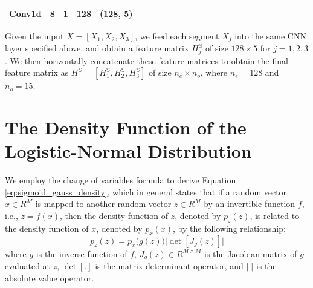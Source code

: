 \begin{appendices}
\begin{table}[h]
\begin{threeparttable}
\begin{tabular}{L{50pt}C{40pt}C{30pt}C{40pt}C{60pt}}
    Conv1d & 8 & 1 & 128 & (128, 5) \\
    \bottomrule
\end{tabular}
\end{threeparttable}
\end{table}

Given the input $X=[X_1,X_2,X_3]$, we feed each segment $X_j$ into the same CNN layer specified above, and obtain a feature matrix $H_j^\mathbb{S}$ of size $128 \times 5$ for $j=1,2,3$. We then horizontally concatenate these feature matrices to obtain the final feature matrix as $H^\mathbb{S}=[H_1^\mathbb{S}, H_2^\mathbb{S}, H_3^\mathbb{S}]$ of size $n_e \times n_o$, where $n_e=128$ and $n_o=15$.

\clearpage

\section{The Density Function of the Logistic-Normal Distribution}\label{apd:der_logistic_normal}

We employ the change of variables formula  to derive Equation \ref{eq:sigmoid_gauss_density}, which in general states that if a random vector $x \in R^{M}$ is mapped to another random vector $z \in R^{M}$ by an invertible
function $f$, i.e., $z=f(x)$, then the density function of $z$, denoted by $p_z(z)$, is related to the density function of $x$, denoted by $p_x(x)$, by the following relationship:
\begin{equation}
\label{eq:change_of_var}
p_z(z) = p_x\big( g(z) \big) \big| \det[J_g(z)] \big|
\end{equation}
where $g$ is the inverse function of $f$, $J_{g}(z) \in R^{M \times M}$ is the Jacobian matrix of $g$ evaluated at $z$, $\det [.]$ is the matrix determinant operator, and $|.|$ is the absolute value operator. 


\end{appendices}
